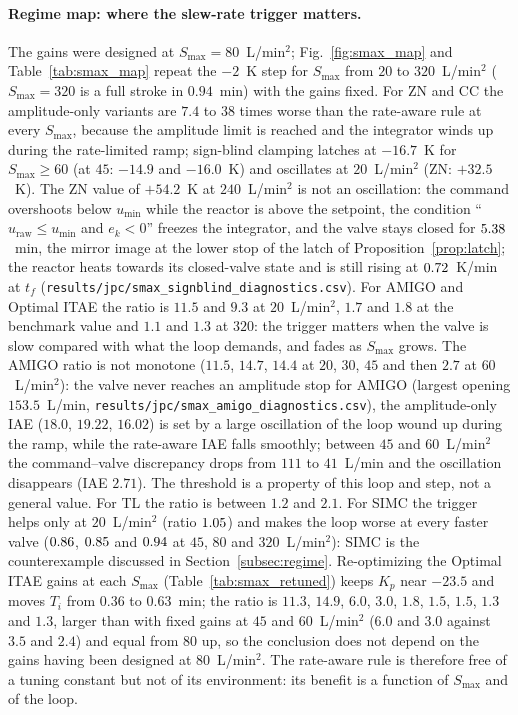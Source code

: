 \documentclass[11pt]{article}
\begin{document}
\paragraph{Regime map: where the slew-rate trigger matters.} The gains were designed at $S_{\max} = 80$~L/min$^2$; Fig.~\ref{fig:smax_map} and Table~\ref{tab:smax_map} repeat the $-2$~K step for $S_{\max}$ from $20$ to $320$~L/min$^2$ ($S_{\max} = 320$ is a full stroke in $0.94$~min) with the gains fixed. For ZN and CC the amplitude-only variants are $7.4$ to $38$ times worse than the rate-aware rule at every $S_{\max}$, because the amplitude limit is reached and the integrator winds up during the rate-limited ramp; sign-blind clamping latches at $-16.7$~K for $S_{\max} \ge 60$ (at $45$: $-14.9$ and $-16.0$~K) and oscillates at $20$~L/min$^2$ (ZN: $+32.5$~K). The ZN value of $+54.2$~K at $240$~L/min$^2$ is not an oscillation: the command overshoots below $u_{\min}$ while the reactor is above the setpoint, the condition ``$u_{\text{raw}} \le u_{\min}$ and $e_k < 0$'' freezes the integrator, and the valve stays closed for $5.38$~min, the mirror image at the lower stop of the latch of Proposition~\ref{prop:latch}; the reactor heats towards its closed-valve state and is still rising at $0.72$~K/min at $t_f$ (\texttt{results/jpc/smax\_signblind\_diagnostics.csv}). For AMIGO and Optimal ITAE the ratio is $11.5$ and $9.3$ at $20$~L/min$^2$, $1.7$ and $1.8$ at the benchmark value and $1.1$ and $1.3$ at $320$: the trigger matters when the valve is slow compared with what the loop demands, and fades as $S_{\max}$ grows. The AMIGO ratio is not monotone ($11.5$, $14.7$, $14.4$ at $20$, $30$, $45$ and then $2.7$ at $60$~L/min$^2$): the valve never reaches an amplitude stop for AMIGO (largest opening $153.5$~L/min, \texttt{results/jpc/smax\_amigo\_diagnostics.csv}), the amplitude-only IAE ($18.0$, $19.22$, $16.02$) is set by a large oscillation of the loop wound up during the ramp, while the rate-aware IAE falls smoothly; between $45$ and $60$~L/min$^2$ the command--valve discrepancy drops from $111$ to $41$~L/min and the oscillation disappears (IAE $2.71$). The threshold is a property of this loop and step, not a general value. For TL the ratio is between $1.2$ and $2.1$. For SIMC the trigger helps only at $20$~L/min$^2$ (ratio $1.05$) and makes the loop worse at every faster valve ($0.86$, $0.85$ and $0.94$ at $45$, $80$ and $320$~L/min$^2$): SIMC is the counterexample discussed in Section~\ref{subsec:regime}. Re-optimizing the Optimal ITAE gains at each $S_{\max}$ (Table~\ref{tab:smax_retuned}) keeps $K_p$ near $-23.5$ and moves $T_i$ from $0.36$ to $0.63$~min; the ratio is $11.3$, $14.9$, $6.0$, $3.0$, $1.8$, $1.5$, $1.5$, $1.3$ and $1.3$, larger than with fixed gains at $45$ and $60$~L/min$^2$ ($6.0$ and $3.0$ against $3.5$ and $2.4$) and equal from $80$ up, so the conclusion does not depend on the gains having been designed at $80$~L/min$^2$. The rate-aware rule is therefore free of a tuning constant but not of its environment: its benefit is a function of $S_{\max}$ and of the loop.
\end{document}

